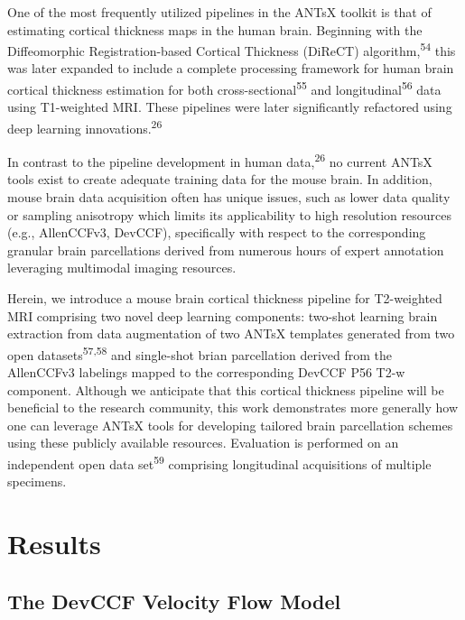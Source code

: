 \documentclass[
  12pt,
]{article}
\begin{document}
One of the most frequently utilized pipelines in the ANTsX toolkit is
that of estimating cortical thickness maps in the human brain. Beginning
with the Diffeomorphic Registration-based Cortical Thickness (DiReCT)
algorithm,\textsuperscript{54} this was later expanded to include a
complete processing framework for human brain cortical thickness
estimation for both cross-sectional\textsuperscript{55} and
longitudinal\textsuperscript{56} data using T1-weighted MRI. These
pipelines were later significantly refactored using deep learning
innovations.\textsuperscript{26}

In contrast to the pipeline development in human
data,\textsuperscript{26} no current ANTsX tools exist to create
adequate training data for the mouse brain. In addition, mouse brain
data acquisition often has unique issues, such as lower data quality or
sampling anisotropy which limits its applicability to high resolution
resources (e.g., AllenCCFv3, DevCCF), specifically with respect to the
corresponding granular brain parcellations derived from numerous hours
of expert annotation leveraging multimodal imaging resources.

Herein, we introduce a mouse brain cortical thickness pipeline for
T2-weighted MRI comprising two novel deep learning components: two-shot
learning brain extraction from data augmentation of two ANTsX templates
generated from two open datasets\textsuperscript{57,58} and single-shot
brian parcellation derived from the AllenCCFv3 labelings mapped to the
corresponding DevCCF P56 T2-w component. Although we anticipate that
this cortical thickness pipeline will be beneficial to the research
community, this work demonstrates more generally how one can leverage
ANTsX tools for developing tailored brain parcellation schemes using
these publicly available resources. Evaluation is performed on an
independent open data set\textsuperscript{59} comprising longitudinal
acquisitions of multiple specimens.

\clearpage
\newpage

\hypertarget{results}{%
\section{Results}\label{results}}

\hypertarget{the-devccf-velocity-flow-model-1}{%
\subsection{The DevCCF Velocity Flow
Model}\label{the-devccf-velocity-flow-model-1}}
\end{document}
